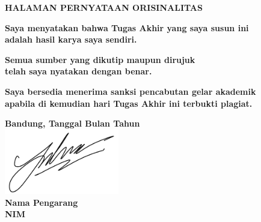 	\begin{center}
		\vspace*{0cm}
		
		{\large \bfseries HALAMAN PERNYATAAN ORISINALITAS \\}
		
		\vspace{4cm}
			
		\textbf{Saya menyatakan bahwa Tugas Akhir yang saya susun ini \\ adalah hasil karya saya sendiri.}
	
		\textbf{Semua sumber yang dikutip maupun dirujuk \\ telah saya nyatakan dengan benar.}
	
		\textbf{Saya bersedia menerima sanksi pencabutan gelar akademik \\ apabila di kemudian hari Tugas Akhir ini terbukti plagiat.}
			
	
		\vspace*{\fill} 
		\textbf{Bandung, Tanggal Bulan Tahun} \\
		\includegraphics[width=5cm]{img/sign.png}\\
		\textbf{Nama Pengarang} \\
		\textbf{NIM}
		\vspace{1cm}
		
	\end{center}